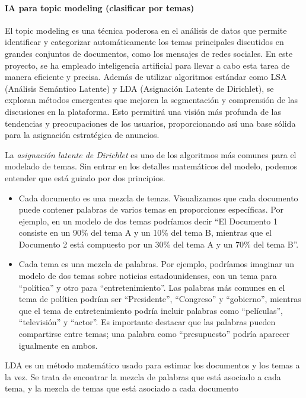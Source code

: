 \documentclass[
  letterpaper,
  DIV=11,
  numbers=noendperiod]{scrartcl}
\let\oldparagraph\paragraph
\renewcommand{\paragraph}[1]{\oldparagraph{#1}\mbox{}}
\begin{document}
\paragraph{IA para topic modeling (clasificar por
temas)}\label{ia-para-topic-modeling-clasificar-por-temas}

El topic modeling es una técnica poderosa en el análisis de datos que
permite identificar y categorizar automáticamente los temas principales
discutidos en grandes conjuntos de documentos, como los mensajes de
redes sociales. En este proyecto, se ha empleado inteligencia artificial
para llevar a cabo esta tarea de manera eficiente y precisa. Además de
utilizar algoritmos estándar como LSA (Análisis Semántico Latente) y LDA
(Asignación Latente de Dirichlet), se exploran métodos emergentes que
mejoren la segmentación y comprensión de las discusiones en la
plataforma. Esto permitirá una visión más profunda de las tendencias y
preocupaciones de los usuarios, proporcionando así una base sólida para
la asignación estratégica de anuncios.

La \emph{asignación latente de Dirichlet} es uno de los algoritmos más
comunes para el modelado de temas. Sin entrar en los detalles
matemáticos del modelo, podemos entender que está guiado por dos
principios.

\begin{itemize}
\item
  Cada documento es una mezcla de temas. Visualizamos que cada documento
  puede contener palabras de varios temas en proporciones específicas.
  Por ejemplo, en un modelo de dos temas podríamos decir ``El Documento
  1 consiste en un 90\% del tema A y un 10\% del tema B, mientras que el
  Documento 2 está compuesto por un 30\% del tema A y un 70\% del tema
  B''.
\item
  Cada tema es una mezcla de palabras. Por ejemplo, podríamos imaginar
  un modelo de dos temas sobre noticias estadounidenses, con un tema
  para ``política'' y otro para ``entretenimiento''. Las palabras más
  comunes en el tema de política podrían ser ``Presidente'',
  ``Congreso'' y ``gobierno'', mientras que el tema de entretenimiento
  podría incluir palabras como ``películas'', ``televisión'' y
  ``actor''. Es importante destacar que las palabras pueden compartirse
  entre temas; una palabra como ``presupuesto'' podría aparecer
  igualmente en ambos.
\end{itemize}

LDA es un método matemático usado para estimar los documentos y los
temas a la vez. Se trata de encontrar la mezcla de palabras que está
asociado a cada tema, y la mezcla de temas que está asociado a cada
documento
\end{document}
